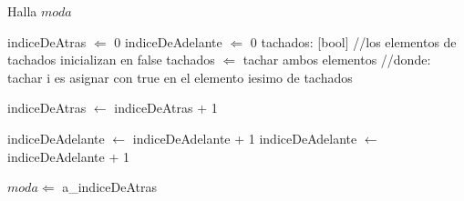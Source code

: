 \begin{algorithm}
\caption{Halla $moda$}
\begin{algorithmic}[1]
\STATE indiceDeAtras $\Leftarrow$ 0
\STATE indiceDeAdelante $\Leftarrow$ 0
\STATE tachados: [bool] //los elementos de tachados inicializan en false
        \STATE tachados $\Leftarrow$ tachar ambos elementos //donde: tachar i es asignar con true en el elemento iesimo de tachados

            \STATE indiceDeAtras $\leftarrow$ indiceDeAtras + 1
        \ENDWHILE
    
            \STATE indiceDeAdelante $\leftarrow$ indiceDeAdelante + 1
        \ENDWHILE
    \ELSE
        \STATE indiceDeAdelante $\leftarrow$ indiceDeAdelante + 1
    \ENDIF

\ENDWHILE
\STATE $moda \Leftarrow$ a_{indiceDeAtras}
\end{algorithmic}
\end{algorithm}